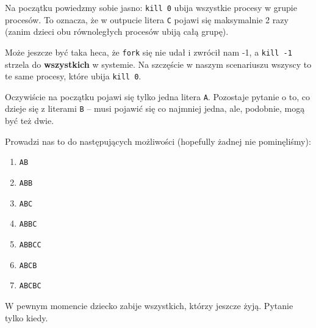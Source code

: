Na początku powiedzmy sobie jasno: \texttt{kill 0} ubija wszystkie procesy w grupie procesów. To oznacza, że w outpucie litera \texttt{C} pojawi się maksymalnie 2 razy (zanim dzieci obu równoległych procesów ubiją całą grupę).

Może jeszcze być taka heca, że \texttt{fork} się nie udał i zwrócił nam -1, a \texttt{kill -1} strzela do \textbf{wszystkich} w systemie. Na szczęście w naszym scenariuszu wszyscy to te same procesy, które ubija \texttt{kill 0}.

Oczywiście na początku pojawi się tylko jedna litera \texttt{A}. Pozostaje pytanie o to, co dzieje się z literami \texttt{B} -- musi pojawić się co najmniej jedna, ale, podobnie, mogą być też dwie.

Prowadzi nas to do następujących możliwości (hopefully żadnej nie pominęliśmy):
\begin{enumerate}
	\item \texttt{AB}
	\item \texttt{ABB}
	\item \texttt{ABC}
	\item \texttt{ABBC}
	\item \texttt{ABBCC}
	\item \texttt{ABCB}
	\item \texttt{ABCBC}
\end{enumerate}

W pewnym momencie dziecko zabije wszystkich, którzy jeszcze żyją. Pytanie tylko kiedy.

